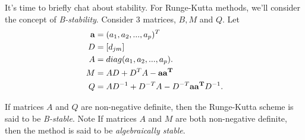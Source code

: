 \documentclass[paper=a4, fontsize=11pt]{scrartcl} %
\numberwithin{equation}{section} %
\numberwithin{figure}{section} %
\numberwithin{table}{section} %
\begin{document}
It's time to briefly chat about stability. For Runge-Kutta methods, we'll consider the concept of \emph{B-stability}. Consider 3 matrices, $B,M$ and $Q$. Let 
\begin{align}
\nonumber
\begin{split}
{\bf{a}} &= (a_1,a_2,...,a_p)^T \\ 
D &= \left[ d_{jm} \right] \\
A &= diag(a_1,a_2,...,a_p). \\ 
M &= AD+ D^TA - {{\bf{aa^T}}} \\
Q &= AD^{-1} +D^{-T} A-D^{-T} {\bf{aa^{T}}} D^{-1}.\\
\end{split}
\end{align}

If matrices $A$ and $Q$ are non-negative definite, then the Runge-Kutta scheme is said to be \emph{B-stable}. Note If matrices $A$ and $M$ are both non-negative definite, then the method is said to be \emph{algebraically stable}.
\end{document}
